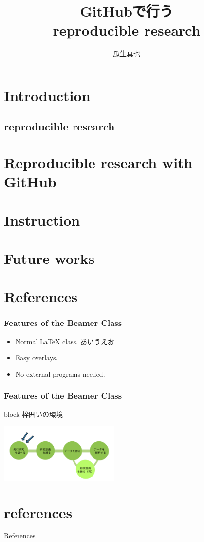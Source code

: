 \documentclass[dvipdfmx, 14pt]{beamer}
\title{GitHubで行う\\reproducible research}
\author[瓜生]{\href{http://urush.postach.io}{瓜生真也}}
\institute[横国大院・環情]{横浜国立大学大学院 環境情報学府}
\date{\scriptsize GitHub Kaigi(@Shibuya), June 1, 2014

\vspace{1em}
\href{http://github.com/uribo/rep-res-guideline}{github.com/uribo}

}
\begin{document}
\frame{\titlepage}
\section[Outline]{}
\frame{\tableofcontents}
\section{Introduction}
  \subsection{reproducible research}
\section{Reproducible research with GitHub}
\section{Instruction}
\section{Future works}
\section{References}
\frame
{
  \frametitle{Features of the Beamer Class}
  \begin{itemize}
  \item<1-> Normal LaTeX class. あいうえお
  \item<2-> Easy overlays.
  \item<3-> No external programs needed.      
  \end{itemize}
  
}



\frame
{
  \frametitle{Features of the Beamer Class}
  
  \begin{block}{block}
枠囲いの環境
\end{block}
\includegraphics[height=3cm,keepaspectratio] {research-flow}
}

\section*{references}
 \begin{frame}[allowframebreaks]{References}
  \scriptsize
  
  
 \end{frame}
\end{document}
